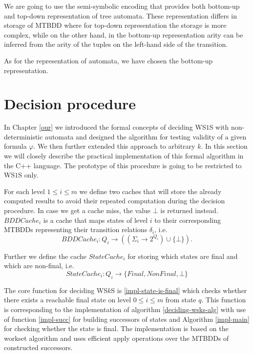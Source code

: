 We are going to use the semi-symbolic encoding that provides both bottom-up and
top-down representation of tree automata. These representation differs in
storage of MTBDD where for top-down representation the storage is more complex,
while on the other hand, in the bottom-up representation arity can be inferred
from the arity of the tuples on the left-hand side of the transition.

As for the representation of automata, we have chosen the bottom-up
representation.

 \section{Decision procedure}
 
 In Chapter \ref{our} we introduced the formal concepts of deciding WS$1$S
 with non-deterministic automata and designed the algorithm for testing
 validity of a given formula $\varphi$. We then further extended this approach
 to arbitrary $k$. In this section we will closely describe the practical
 implementation of this formal algorithm in the C++ language. The prototype of
 this procedure is going to be restricted to WS$1$S only.
 
 For each level $1 \leq i \leq m$ we define two caches that will store the
 already computed results to avoid their repeated computation during the
 decision procedure. In case we get a cache miss, the value $\bot$ is returned
 instead. $\mathit{BDDCache}_i$ is a cache that maps states of level $i$ to
 their corresponding MTBDDs representing their transition relations $\delta_i$, i.e.
 \begin{equation}
  \mathit{BDDCache}_i : Q_i \rightarrow ((\Sigma_i \rightarrow 2^{Q_i}) \cup
  \{\bot\}).
 \end{equation}
 
 Further we define the cache $\mathit{StateCache}_i$ for storing which states
 are final and which are non-final, i.e.
 \begin{equation}
  \mathit{StateCache}_i : Q_i \rightarrow \{Final, NonFinal, \bot\}
 \end{equation}
 
 The core function for deciding WS$k$S is \ref{impl-state-is-final} which checks
 whether there exists a reachable final state on level $0 \leq i \leq m$ from
 state $q$. This function is corresponding to the implementation of algorithm
 \ref{deciding-wsks-alg} with use of function \ref{impl-succ} for building successors of
 states and Algorithm \ref{impl-main} for checking whether the state is final.
 The implementation is based on the workset algorithm and uses efficient apply
 operations over the MTBDDs of constructed successors.
 
